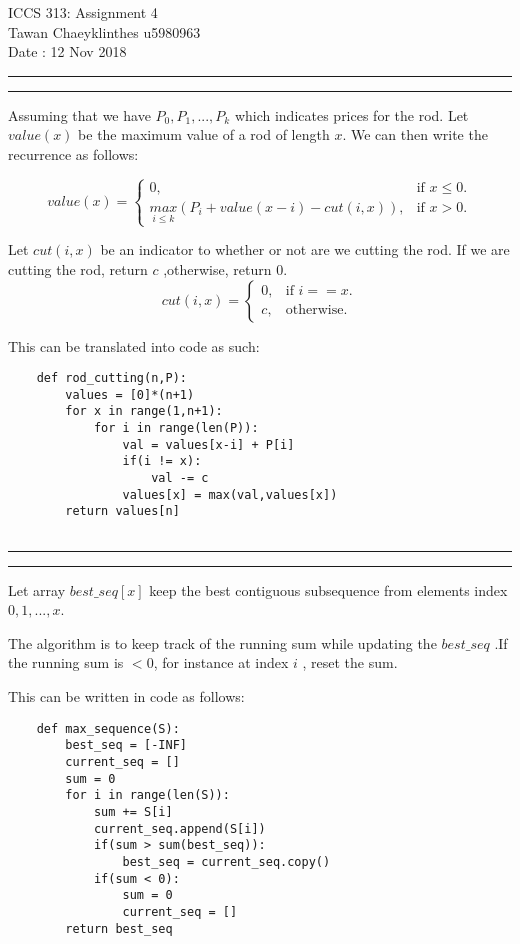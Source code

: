 \documentclass[a4paper, 12pt]{article}
\newcommand{\question}[1] {\vspace{.25in} \hrule\vspace{0.5em}
	\noindent{\bf #1} \vspace{0.5em}
	\hrule \vspace{.10in}}
\begin{document}
	\medskip
	
	\thispagestyle{plain}
	\begin{center}
		{\Large ICCS 313: Assignment 4} \\
		Tawan Chaeyklinthes u5980963 \\
		Date : 12 Nov 2018
	\end{center}

\question{Problem 1}

Assuming that we have $P_0,P_1,...,P_k $ which indicates prices for the rod. Let $value(x)$ be the maximum value of a rod of length $x$. We can then write the recurrence as follows:

\begin{equation*}
	value(x)=\begin{cases}
			0, & \text{if $x\leqslant 0$.}\\	
			\underset{i \leqslant k }{max}(P_i + value(x-i) -cut(i,x)), & \text{if $x > 0$.}
		\end{cases}	
\end{equation*}

Let $cut(i,x)$ be an indicator to whether or not are we cutting the rod. If we are cutting the rod, return $c$ ,otherwise, return 0.
\begin{equation*}	
	cut(i,x) = \begin{cases}
	0 , & \text{if $i==x$.}\\
	c, & \text{otherwise.}
	\end{cases}
\end{equation*}

This can be translated into code as such:
\begin{lstlisting}
	def rod_cutting(n,P):
		values = [0]*(n+1)
		for x in range(1,n+1):
			for i in range(len(P)):
				val = values[x-i] + P[i]
				if(i != x):
					val -= c
				values[x] = max(val,values[x])
		return values[n] 
		
\end{lstlisting}

\question{Problem 2}

Let array $best\_seq[x]$ keep the best contiguous subsequence from elements index $0,1,...,x$.

The algorithm is to keep track of the running sum while updating the $best\_seq$ .If the running sum is $< 0$, for instance at index $i$ , reset the sum.

This can be written in code as follows:

\begin{lstlisting}
	def max_sequence(S):
		best_seq = [-INF]
		current_seq = []
		sum = 0
		for i in range(len(S)):
			sum += S[i]
			current_seq.append(S[i]) 
			if(sum > sum(best_seq)):
				best_seq = current_seq.copy()	
			if(sum < 0):
				sum = 0
				current_seq = []	
		return best_seq
\end{lstlisting}
\end{document}
